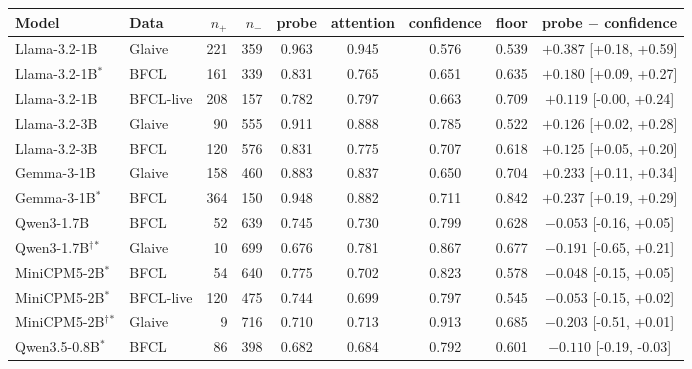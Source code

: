 \begin{tabular}{llrrccccc}
\toprule
Model & Data & $n_+$ & $n_-$ & probe & attention & confidence & floor & probe $-$ confidence \\
\midrule
Llama-3.2-1B & Glaive & 221 & 359 & 0.963 & 0.945 & 0.576 & 0.539 & $+0.387$ [+0.18, +0.59] \\
Llama-3.2-1B$^{*}$ & BFCL & 161 & 339 & 0.831 & 0.765 & 0.651 & 0.635 & $+0.180$ [+0.09, +0.27] \\
Llama-3.2-1B & BFCL-live & 208 & 157 & 0.782 & 0.797 & 0.663 & 0.709 & $+0.119$ [-0.00, +0.24] \\
Llama-3.2-3B & Glaive & 90 & 555 & 0.911 & 0.888 & 0.785 & 0.522 & $+0.126$ [+0.02, +0.28] \\
Llama-3.2-3B & BFCL & 120 & 576 & 0.831 & 0.775 & 0.707 & 0.618 & $+0.125$ [+0.05, +0.20] \\
Gemma-3-1B & Glaive & 158 & 460 & 0.883 & 0.837 & 0.650 & 0.704 & $+0.233$ [+0.11, +0.34] \\
Gemma-3-1B$^{*}$ & BFCL & 364 & 150 & 0.948 & 0.882 & 0.711 & 0.842 & $+0.237$ [+0.19, +0.29] \\
\midrule
Qwen3-1.7B & BFCL & 52 & 639 & 0.745 & 0.730 & 0.799 & 0.628 & $-0.053$ [-0.16, +0.05] \\
Qwen3-1.7B$^\dagger$$^{*}$ & Glaive & 10 & 699 & 0.676 & 0.781 & 0.867 & 0.677 & $-0.191$ [-0.65, +0.21] \\
MiniCPM5-2B$^{*}$ & BFCL & 54 & 640 & 0.775 & 0.702 & 0.823 & 0.578 & $-0.048$ [-0.15, +0.05] \\
MiniCPM5-2B$^{*}$ & BFCL-live & 120 & 475 & 0.744 & 0.699 & 0.797 & 0.545 & $-0.053$ [-0.15, +0.02] \\
MiniCPM5-2B$^\dagger$$^{*}$ & Glaive & 9 & 716 & 0.710 & 0.713 & 0.913 & 0.685 & $-0.203$ [-0.51, +0.01] \\
Qwen3.5-0.8B$^{*}$ & BFCL & 86 & 398 & 0.682 & 0.684 & 0.792 & 0.601 & $-0.110$ [-0.19, -0.03] \\
\bottomrule
\end{tabular}
